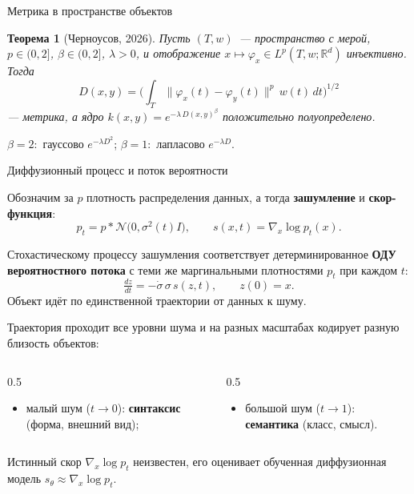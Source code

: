 \documentclass[aspectratio=43]{beamer}
\newtheorem{rustheorem}{Теорема}
\begin{document}
\begin{frame}{Метрика в пространстве объектов}
\justifying

\begin{rustheorem}[Черноусов, 2026]
Пусть $(T,w)$~--- пространство с мерой, $p\in(0,2]$, $\beta\in(0,2]$,
$\lambda>0$, и отображение $x\mapsto\varphi_x\in L^p(T,w;\mathbb{R}^d)$
инъективно. Тогда
\[
    D(x,y)=\Big(\int_T\|\varphi_x(t)-\varphi_y(t)\|^{p}\, w(t)\,dt\Big)^{1/2}
\]
--- метрика, а ядро $k(x,y)=e^{-\lambda\,D(x,y)^{\beta}}$ положительно
полуопределено.
\end{rustheorem}

\begin{center}
$\beta=2$:\, гауссово $e^{-\lambda D^2}$;\qquad
$\beta=1$:\, лапласово $e^{-\lambda D}$.
\end{center}
\end{frame}

\begin{frame}{Диффузионный процесс и поток вероятности}
\justifying

Обозначим за $p$ плотность распределения данных, а тогда \textbf{зашумление} и
\textbf{скор-функция}:
\[
    p_t = p * \mathcal{N}\bigl(0, \sigma^2(t) I\bigr),
    \qquad
    s(x,t) = \nabla_x \log p_t(x).
\]

\smallskip
Стохастическому процессу зашумления соответствует детерминированное \textbf{ОДУ
вероятностного потока} с теми же маргинальными плотностями $p_t$ при каждом $t$:
\[
    \tfrac{dz}{dt} = -\dot\sigma\,\sigma\, s(z,t),\qquad z(0)=x.
\]
Объект идёт по единственной траектории от данных к шуму.

\medskip
Траектория проходит все уровни шума и на разных масштабах кодирует разную
близость объектов:
\begin{columns}[T]
\begin{column}{0.5\textwidth}
\begin{itemize}
    \item малый шум ($t\to0$): \textbf{синтаксис} (форма, внешний вид);
\end{itemize}
\end{column}
\begin{column}{0.5\textwidth}
\begin{itemize}
    \item большой шум ($t\to1$): \textbf{семантика} (класс, смысл).
\end{itemize}
\end{column}
\end{columns}

\medskip
{\footnotesize Истинный скор $\nabla_x\log p_t$ неизвестен, его оценивает
обученная диффузионная модель $s_\theta \approx \nabla_x\log p_t$.}
\end{frame}
\end{document}
